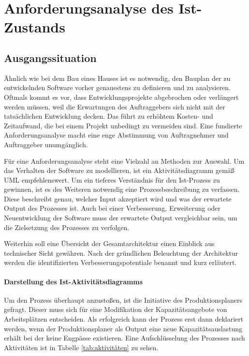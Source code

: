 \section{Anforderungsanalyse des Ist-Zustands}
\subsection{Ausgangssituation}
Ähnlich wie bei dem Bau eines Hauses ist es notwendig, den Bauplan der zu entwickelnden Software vorher genauestens zu definieren und zu analysieren. Oftmals kommt es vor, dass Entwicklungsprojekte abgebrochen oder verlängert werden müssen, weil die Erwartungen des Auftraggebers sich nicht mit der tatsächlichen Entwicklung decken. Das führt zu erhöhtem Kosten- und Zeitaufwand, die bei einem Projekt unbedingt zu vermeiden sind. Eine fundierte Anforderungsanalyse macht eine enge Abstimmung von Auftragnehmer und Auftraggeber unumgänglich. 
\autocite{Booch.2006}

Für eine Anforderungsanalyse steht eine Vielzahl an Methoden zur Auswahl. Um das Verhalten der Software zu modellieren, ist ein Aktivitätsdiagramm gemäß UML empfehlenswert. 
\autocite{Booch.2006} 
Um ein tieferes Verständnis für den Ist-Prozess zu gewinnen, ist es des Weiteren notwendig eine Prozessbeschreibung zu verfassen. Diese beschreibt genau, welcher Input akzeptiert wird und was der erwartete Output des Prozesses ist. Auch bei einer Verbesserung, Erweiterung oder Neuentwicklung der Software muss der erwartete Output vergleichbar sein, um die Zielsetzung des Prozesses zu verfolgen. 

Weiterhin soll eine Übersicht der Gesamtarchitektur einen Einblick aus technischer Sicht gewähren. Nach der gründlichen Beleuchtung der Architektur werden die identifizierten Verbesserungspotentiale benannt und kurz erläutert.

\paragraph{Darstellung des Ist-Aktivitätsdiagramms} Um den Prozess überhaupt anzustoßen, ist die Initiative des Produktionsplaners gefragt. Dieser muss sich für eine Modifikation der Kapazitätsangebote von Arbeitsplätzen entscheiden. Als erfolgreich kann der Prozess erst dann deklariert werden, wenn der Produktionsplaner als Output eine neue Kapazitätsauslastung erhält bei der keine Engpässe existieren. Eine Aufschlüsselung des Prozesses nach Aktivitäten ist in Tabelle \ref{tab:aktivitäten} zu sehen.

